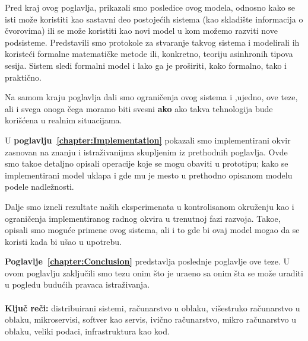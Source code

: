 Pred kraj ovog poglavlja, prikazali smo posledice ovog modela, odnosno kako se isti mo\v ze koristiti kao sastavni deo postoje\'cih sistema (kao skladi\v ste informacija o \v cvorovima) ili se mo\v ze koristiti kao novi model u kom mo\v zemo razviti nove podsisteme. Predstavili smo protokole za stvaranje takvog sistema i modelirali ih koriste\'ci formalne matemati\v cke metode ili, konkretno, teoriju asinhronih tipova sesija. Sistem sledi formalni model i lako ga je pro\v siriti, kako formalno, tako i prakti\v cno.

Na samom kraju poglavlja dali smo ograni\v cenja ovog sistema i ,ujedno, ove teze, ali i svega onoga \v cega moramo biti svesni \textbf{ako} ako takva tehnologija bude kori\v s\'cena u realnim situacijama.

U \textbf{poglavlju~\ref{chapter:Implementation}} pokazali smo implementirani okvir zasnovan na znanju i istra\v zivanijma skupljenim iz prethodnih poglavlja. Ovde smo tako\dj e detaljno opisali operacije koje se mogu obaviti u prototipu; kako se implementirani model uklapa i gde mu je mesto u prethodno opisanom modelu podele nadle\v znosti.

Dalje smo izneli rezultate na\v sih eksperimenata u kontrolisanom okru\v zenju kao i ograni\v cenja implementiranog radnog okvira u trenutnoj fazi razvoja. Tako\dj e, opisali smo mogu\'ce primene ovog sistema, ali i to gde bi ovaj model mogao da se koristi kada bi u\v sao u upotrebu.

\textbf{Poglavlje~\ref{chapter:Conclusion}} predstavlja poslednje poglavlje ove teze. U ovom poglavlju zaklju\v cili smo tezu onim \v sto je ura\dj eno sa onim \v sta se mo\v ze uraditi u pogledu budu\'cih pravaca istra\v zivanja.\\\\

\noindent
\textbf{Klju\v c re\v ci:} distribuirani sistemi, ra\v cunarstvo u oblaku, vi\v sestruko ra\v cunarstvo u oblaku, mikroservisi, softver kao servis, ivi\v cno ra\v cunarstvo, mikro ra\v cunarstvo u oblaku, veliki podaci, infrastruktura kao kod.